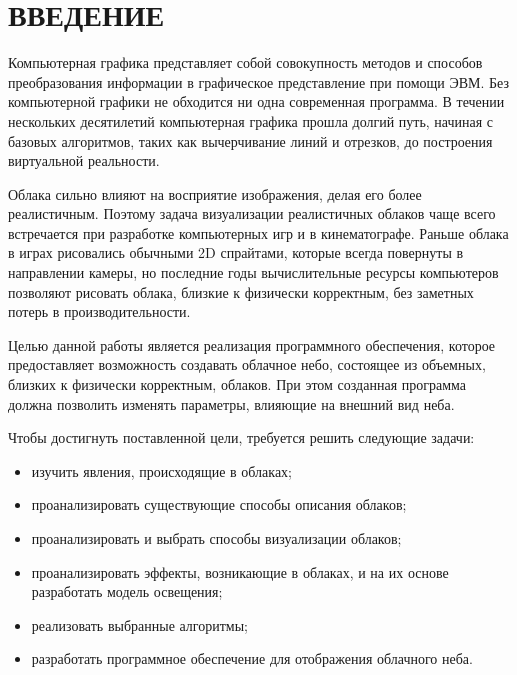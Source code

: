 \chapter*{ВВЕДЕНИЕ}

Компьютерная графика представляет собой совокупность методов
и способов преобразования информации в графическое представление при
помощи ЭВМ. Без компьютерной графики не обходится ни одна современная
программа. В течении нескольких десятилетий компьютерная графика прошла
долгий путь, начиная с базовых алгоритмов, таких как вычерчивание линий
и отрезков, до построения виртуальной реальности.

Облака сильно влияют на восприятие изображения, делая его более реалистичным. Поэтому задача визуализации реалистичных облаков чаще всего встречается при разработке компьютерных игр и в кинематографе. Раньше облака в играх рисовались обычными 2D спрайтами, которые всегда повернуты в направлении камеры, но последние годы вычислительные ресурсы компьютеров позволяют рисовать облака, близкие к физически корректным, без заметных потерь в производительности.

Целью данной работы является реализация программного обеспечения, которое предоставляет возможность создавать облачное небо, состоящее из объемных, близких к физически корректным, облаков. При этом созданная программа должна позволить изменять параметры, влияющие на внешний вид неба.

Чтобы достигнуть поставленной цели, требуется решить следующие задачи:

\begin{itemize}
	\item изучить явления, происходящие в облаках;
	\item проанализировать существующие способы описания облаков;
	\item проанализировать и выбрать способы визуализации облаков;
	\item проанализировать эффекты, возникающие в облаках, и на их основе разработать модель освещения;
	\item реализовать выбранные алгоритмы;
	\item разработать программное обеспечение для отображения облачного неба.
\end{itemize}